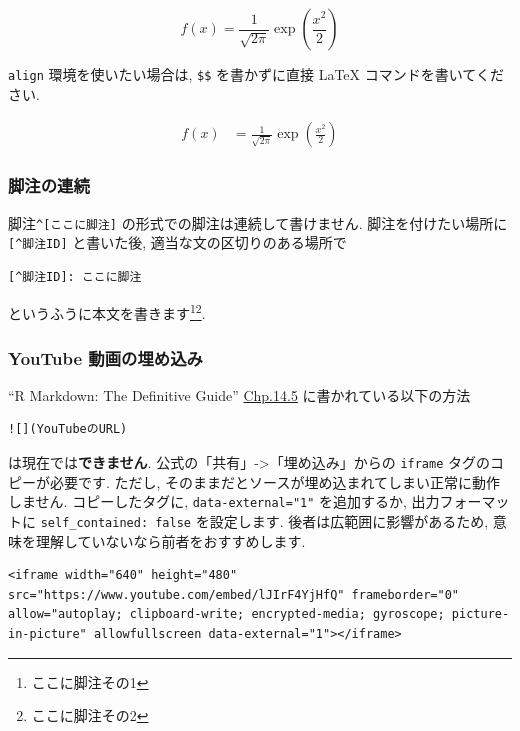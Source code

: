 \documentclass[
]{ltjsarticle}
\begin{document}
\[
f(x) = \frac1{\sqrt{2\pi}}\exp\left(\frac{x^2}{2}\right) \label{eq:norm}
\]

\texttt{align} 環境を使いたい場合は, \texttt{\$\$} を書かずに直接 LaTeX コマンドを書いてください.

\begin{align}
f(x) &= \frac1{\sqrt{2\pi}}\exp\left(\frac{x^2}{2}\right) \label{eq:norm2}
\end{align}

\hypertarget{ux811aux6ce8ux306eux9023ux7d9a}{%
\subsubsection{脚注の連続}\label{ux811aux6ce8ux306eux9023ux7d9a}}

脚注\texttt{\^{}{[}ここに脚注{]}} の形式での脚注は連続して書けません. 脚注を付けたい場所に \texttt{{[}\^{}脚注ID{]}} と書いた後, 適当な文の区切りのある場所で

\begin{verbatim}
[^脚注ID]: ここに脚注
\end{verbatim}

というふうに本文を書きます\footnote{ここに脚注その1}\footnote{ここに脚注その2}.

\hypertarget{youtube-ux52d5ux753bux306eux57cbux3081ux8fbcux307f}{%
\subsubsection{YouTube 動画の埋め込み}\label{youtube-ux52d5ux753bux306eux57cbux3081ux8fbcux307f}}

``R Markdown: The Definitive Guide'' \href{https://bookdown.org/yihui/rmarkdown/learnr-videos.html}{Chp.14.5} に書かれている以下の方法

\begin{verbatim}
![](YouTubeのURL)
\end{verbatim}

は現在では\textbf{できません}. 公式の「共有」-\textgreater「埋め込み」からの \texttt{iframe} タグのコピーが必要です. ただし, そのままだとソースが埋め込まれてしまい正常に動作しません. コピーしたタグに, \texttt{data-external="1"} を追加するか, 出力フォーマットに \texttt{self\_contained:\ false} を設定します. 後者は広範囲に影響があるため, 意味を理解していないなら前者をおすすめします.

\begin{verbatim}
<iframe width="640" height="480" src="https://www.youtube.com/embed/lJIrF4YjHfQ" frameborder="0" allow="autoplay; clipboard-write; encrypted-media; gyroscope; picture-in-picture" allowfullscreen data-external="1"></iframe>
\end{verbatim}
\end{document}
